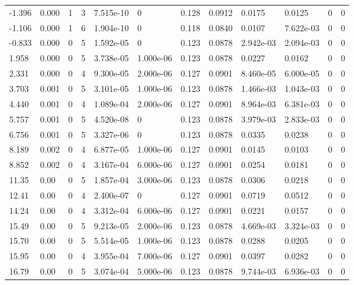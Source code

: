\documentclass[preview]{standalone}
\begin{document}
{{\begin{tabular}{L{1.2cm}C{1.2cm} C{0.3cm}C{0.5cm} C{1.4cm}C{1.4cm} C{1.4cm}C{1.4cm} C{1.6cm}C{1.6cm} C{1.6cm}C{1.6cm}}
  -1.396  &  0.000  & 1     &  3 &  7.515e-10  & 0  &  0.128&   0.0912& 0.0175 & 0.0125   &  0 & 0  \\ 
  -1.106  &  0.000  & 1     &  6 &  1.904e-10  & 0  &  0.118&   0.0840& 0.0107 & 7.622e-03   &  0 & 0  \\ 
  -0.833  &  0.000  & 0     &  5 &  1.592e-05  & 0  &  0.123&   0.0878& 2.942e-03 & 2.094e-03   &  0 & 0  \\ 
  1.958  &  0.000  & 0     &  5 &  3.738e-05  & 1.000e-06  &  0.123&   0.0878& 0.0227 & 0.0162   &  0 & 0  \\ 
  2.331  &  0.000  & 0     &  4 &  9.300e-05  & 2.000e-06  &  0.127&   0.0901& 8.460e-05 & 6.000e-05   &  0 & 0  \\ 
  3.703  &  0.001  & 0     &  5 &  3.101e-05  & 1.000e-06  &  0.123&   0.0878& 1.466e-03 & 1.043e-03   &  0 & 0  \\ 
  4.440  &  0.001  & 0     &  4 &  1.089e-04  & 2.000e-06  &  0.127&   0.0901& 8.964e-03 & 6.381e-03   &  0 & 0  \\ 
  5.757  &  0.001  & 0     &  5 &  4.520e-08  & 0  &  0.123&   0.0878& 3.979e-03 & 2.833e-03   &  0 & 0  \\ 
  6.756  &  0.001  & 0     &  5 &  3.327e-06  & 0  &  0.123&   0.0878& 0.0335 & 0.0238   &  0 & 0  \\ 
  8.189  &  0.002  & 0     &  4 &  6.877e-05  & 1.000e-06  &  0.127&   0.0901& 0.0145 & 0.0103   &  0 & 0  \\ 
  8.852  &  0.002  & 0     &  4 &  3.167e-04  & 6.000e-06  &  0.127&   0.0901& 0.0254 & 0.0181   &  0 & 0  \\ 
  11.35  &  0.00  & 0     &  5 &  1.857e-04  & 3.000e-06  &  0.123&   0.0878& 0.0306 & 0.0218   &  0 & 0  \\ 
  12.41  &  0.00  & 0     &  4 &  2.400e-07  & 0  &  0.127&   0.0901& 0.0719 & 0.0512   &  0 & 0  \\ 
  14.24  &  0.00  & 0     &  4 &  3.312e-04  & 6.000e-06  &  0.127&   0.0901& 0.0221 & 0.0157   &  0 & 0  \\ 
  15.49  &  0.00  & 0     &  5 &  9.213e-05  & 2.000e-06  &  0.123&   0.0878& 4.669e-03 & 3.324e-03   &  0 & 0  \\ 
  15.70  &  0.00  & 0     &  5 &  5.514e-05  & 1.000e-06  &  0.123&   0.0878& 0.0288 & 0.0205   &  0 & 0  \\ 
  15.95  &  0.00  & 0     &  4 &  3.955e-04  & 7.000e-06  &  0.127&   0.0901& 0.0397 & 0.0282   &  0 & 0  \\ 
  16.79  &  0.00  & 0     &  5 &  3.074e-04  & 5.000e-06  &  0.123&   0.0878& 9.744e-03 & 6.936e-03   &  0 & 0  \\ 

\end{tabular}}}
\end{document}
